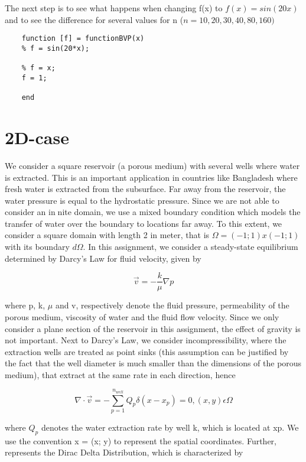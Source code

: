 \documentclass{report}
\begin{document}
The next step is to see what happens when changing f(x) to $f(x)=sin(20x)$ and to see the difference for several values for n ($n=10,20,30,40,80,160)$ 
	
\begin{lstlisting}
	function [f] = functionBVP(x)
	% f = sin(20*x);
	
	% f = x;
	f = 1;
	
	end
\end{lstlisting}





\chapter{2D-case}

We consider a square reservoir (a porous medium) with several wells where water is extracted. This is an important application in countries like Bangladesh where fresh water is extracted from the subsurface. Far away from the reservoir, the water pressure is equal to the hydrostatic pressure. Since we are not able to consider an innite domain, we use a mixed boundary condition which models the transfer of water over the boundary to locations far away. To this extent, we consider a square domain with length 2 in meter, that is $\Omega= (-1; 1) x (-1; 1)$ with its boundary $d\Omega$. In this assignment, we consider a steady-state equilibrium determined by Darcy's Law for fluid velocity, given by

\begin{equation}
\vec{v}=-\frac{k}{\mu}\nabla p
\end{equation}
\medskip

where p, k, $\mu$ and v, respectively denote the 
fluid pressure, permeability of the porous medium, viscosity of water and the 
fluid flow velocity. Since we only
consider a plane section of the reservoir in this assignment, the effect of gravity is not important. Next to Darcy's Law, we consider incompressibility, where
the extraction wells are treated as point sinks (this assumption can be justified by the fact that the well diameter is much smaller than the dimensions of the
porous medium), that extract at the same rate in each direction, hence

\begin{equation}
	\nabla\cdot\vec{v}=-\sum_{p=1}^{n_{well}}Q_p\delta(x-x_p)=0,(x,y) \epsilon\Omega 
\end{equation}

where $Q_p$ denotes the water extraction rate by well k, which is located at xp. We use the convention x = (x; y) to represent the spatial coordinates. Further,  represents the Dirac Delta Distribution, which is characterized by
\end{document}
